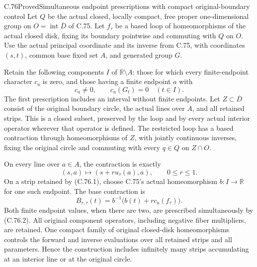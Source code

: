 \begin{claim}{C.76}{Proved}{Simultaneous endpoint prescriptions with compact original-boundary control}
Let $Q$ be the actual closed, locally compact, free proper
one-dimensional group on $O=\operatorname{int}\overline D$
of C.75. Let $f_\tau$ be a based loop of homeomorphisms of
the actual closed disk, fixing its boundary pointwise and
commuting with $Q$ on $O$. Use the actual principal
coordinate and its inverse from C.75, with coordinates
$(s,t)$, common base fixed set $A$, and generated group $G$.

Retain the following components $I$ of $\mathbb R\setminus A$:
those for which every finite-endpoint character $c_a$ is zero,
and those having a finite endpoint $a$ with
\[
       c_a\ne0,\qquad c_a(G_t)=0\quad(t\in I).
                                                               \tag{C.76.1}
\]
The first prescription includes an interval without finite
endpoints. Let $Z\subset\overline D$ consist of the original
boundary circle, the actual lines over $A$, and all retained
strips. This is a closed subset, preserved by the loop and
by every actual interior operator wherever that operator
is defined. The restricted loop has a based contraction
through homeomorphisms of $Z$, with jointly continuous
inverses, fixing the original circle and commuting with
every $q\in Q$ on $Z\cap O$.

On every line over $a\in A$, the contraction is exactly
\[
                  (s,a)\longmapsto(s+r u_\tau(a),a),
                           \qquad 0\leq r\leq1.                \tag{C.76.2}
\]
On a strip retained by (C.76.1), choose C.75's actual
homeomorphism $b:I\to\mathbb R$ for one such endpoint.
The base contraction is
\[
 B_{r,\tau}(t)=b^{-1}\bigl(b(t)+r c_a(f_\tau)\bigr).
                                                               \tag{C.76.3}
\]
Both finite endpoint values, when there are two, are
prescribed simultaneously by (C.76.2). All original
component operators, including negative fiber multipliers,
are retained. One compact family of original closed-disk
homeomorphisms controls the forward and inverse evaluations
over all retained strips and all parameters. Hence the
construction includes infinitely many strips accumulating
at an interior line or at the original circle.


\end{claim}
